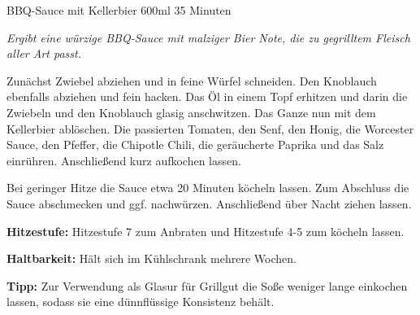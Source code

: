 \documentclass[
  DIV=11,%
  pagesize,%
  fontsize=11pt,%
  paper=a4,%
]{scrartcl}
\begin{document}
\begin{recipe}{BBQ-Sauce mit Kellerbier} {600ml} {35 Minuten}

\freeform
\textit{Ergibt eine würzige BBQ-Sauce mit malziger Bier Note, die zu gegrilltem Fleisch aller Art passt.}


Zunächst Zwiebel abziehen und in feine Würfel schneiden.
Den Knoblauch ebenfalls abziehen und fein hacken.
Das Öl in einem Topf erhitzen und darin die Zwiebeln und den Knoblauch glasig anschwitzen.
Das Ganze nun mit dem Kellerbier ablöschen.
Die passierten Tomaten, den Senf, den Honig, die Worcester Sauce, den Pfeffer, die Chipotle Chili, die geräucherte Paprika und das Salz einrühren.
Anschließend kurz aufkochen lassen.

\newstep
Bei geringer Hitze die Sauce etwa 20 Minuten köcheln lassen.
Zum Abschluss die Sauce abschmecken und ggf. nachwürzen.
Anschließend über Nacht ziehen lassen.

\freeform
\hrulefill

\freeform 
\textbf{Hitzestufe:}
Hitzestufe 7 zum Anbraten und Hitzestufe 4-5 zum köcheln lassen.

\freeform 
\textbf{Haltbarkeit:}
Hält sich im Kühlschrank mehrere Wochen.

\freeform 
\textbf{Tipp:}
Zur Verwendung als Glasur für Grillgut die Soße weniger lange einkochen lassen, sodass sie eine dünnflüssige Konsistenz behält.

\end{recipe}
\end{document}
